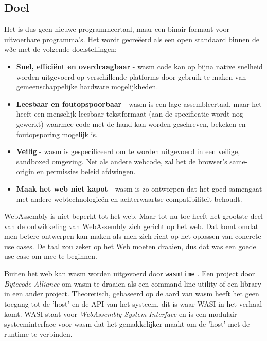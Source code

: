 \subsection{Doel}

Het is dus geen nieuwe programmeertaal, maar een binair formaat voor uitvoerbare programma’s. Het
wordt gecreëerd als een open standaard binnen de \gls{w3c} met de volgende
doelstellingen: 
\begin{itemize}
  \item \textbf{Snel, efficiënt en overdraagbaar} - wasm code kan op bijna native snelheid worden
    uitgevoerd op verschillende platforms door gebruik te maken van gemeenschappelijke hardware
    mogelijkheden. 

  \item \textbf{Leesbaar en foutopspoorbaar} - wasm is een lage assembleertaal, maar het heeft een
    menselijk leesbaar tekstformaat (aan de specificatie wordt nog gewerkt) waarmee code met de hand
    kan worden geschreven, bekeken en foutopsporing mogelijk is. 

  \item \textbf{Veilig} - wasm is gespecificeerd om te worden uitgevoerd in een veilige, sandboxed
    omgeving. Net als andere webcode, zal het de browser's same-origin en permissies beleid
    afdwingen. 

  \item \textbf{Maak het web niet kapot} - wasm is zo ontworpen dat het goed samengaat met andere
    webtechnologieën en achterwaartse compatibiliteit behoudt.
\end{itemize}

WebAssembly is niet beperkt tot het web. Maar tot nu toe heeft het grootste deel van de ontwikkeling
van WebAssembly zich gericht op het web. Dat komt omdat men betere ontwerpen kan maken als men zich
richt op het oplossen van concrete use cases. De taal zou zeker op het Web moeten draaien, dus dat
was een goede use case om mee te beginnen. \cite{wasm_interfaces}

\clearpage

Buiten het web kan wasm worden uitgevoerd door \texttt{wasmtime} \cite{wasm_time}. Een
project door \textit{Bytecode Alliance} om wasm te draaien als een command-line utility of een
library in een ander project. Theoretisch, gebaseerd op de aard van wasm heeft het geen toegang tot
de 'host' en de API van het systeem, dit is waar WASI in het verhaal komt. WASI staat voor
\textit{WebAssembly System Interface} en is een modulair systeeminterface voor wasm dat het
gemakkelijker maakt om de 'host' met de runtime te verbinden.\cite{wasi}


